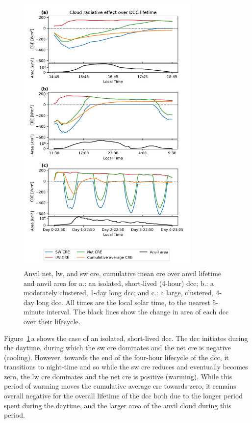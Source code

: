 \begin{figure}[tp]
    \centering
    \includegraphics[width=0.8\textwidth]{figures/chapter4_13.png}
    \caption[
    Anvil net, \acrshort{lw}, and \acrshort{sw} \acrshort{cre}, cumulative mean \acrshort{cre} over anvil lifetime
    ]{
    Anvil net, \acrshort{lw}, and \acrshort{sw} \acrshort{cre}, cumulative mean \acrshort{cre} over anvil lifetime and anvil area for a.: an isolated, short-lived (4-hour) \acrshort{dcc}; b.: a moderately clustered, 1-day long \acrshort{dcc}; and c.: a large, clustered, 4-day long \acrshort{dcc}. All times are the local solar time, to the nearest 5-minute interval. The black lines show the change in area of each \acrshort{dcc} over their lifecycle.
    }
    \label{fig:cre_lifecycle_examples}
\end{figure}


Figure~\ref{fig:cre_lifecycle_examples}\,a shows the case of an isolated, short-lived \acrshort{dcc}. 
The \acrshort{dcc} initiates during the daytime, during which the \acrshort{sw} \acrshort{cre} dominates and the net \acrshort{cre} is negative (cooling). 
However, towards the end of the four-hour lifecycle of the \acrshort{dcc}, it transitions to night-time and so while the \acrshort{sw} \acrshort{cre} reduces and eventually becomes zero, the \acrshort{lw} \acrshort{cre} dominates and the net \acrshort{cre} is positive (warming). 
While this period of warming moves the cumulative average \acrshort{cre} towards zero, it remains overall negative for the overall lifetime of the \acrshort{dcc} both due to the longer period spent during the daytime, and the larger area of the anvil cloud during this period.

